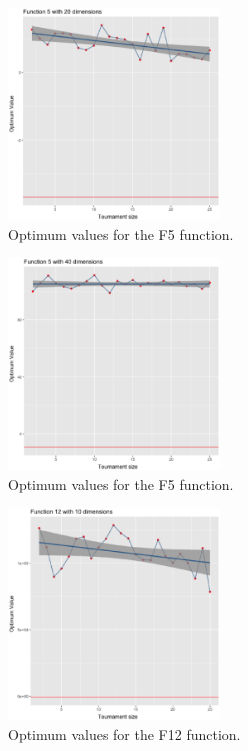 \begin{figure}[!ht]
	\includegraphics[width=0.5\textwidth]{img/5dim_20.ps}
	\caption{Optimum values for the F5 function.}
	\label{5dim_20}
\end{figure}

\begin{figure}[!ht]
	\includegraphics[width=0.5\textwidth]{img/5dim_40.ps}
	\caption{Optimum values for the F5 function.}
	\label{5dim_40}
\end{figure}

\begin{figure}[!ht]
	\includegraphics[width=0.5\textwidth]{img/12dim_10.ps}
	\caption{Optimum values for the F12 function.}
	\label{12dim_10}
\end{figure}


